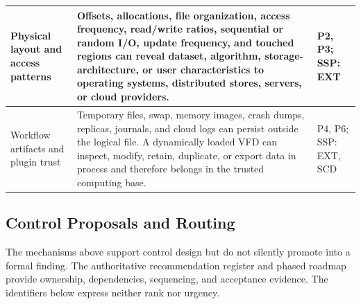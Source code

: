 \documentclass[../main.tex]{subfiles}
\begin{document}
\begin{longtable}{@{}p{}p{}p{}@{}}
Physical layout and access patterns &
Offsets, allocations, file organization, access frequency, read/write ratios,
sequential or random I/O, update frequency, and touched regions can reveal
dataset, algorithm, storage-architecture, or user characteristics to operating
systems, distributed stores, servers, or cloud providers. &
P2, P3; SSP: EXT \\
\hline

Workflow artifacts and plugin trust &
Temporary files, swap, memory images, crash dumps, replicas, journals, and
cloud logs can persist outside the logical file. A dynamically loaded VFD can
inspect, modify, retain, duplicate, or export data in process and therefore
belongs in the trusted computing base. &
P4, P6; SSP: EXT, SCD \\
\hline
\end{longtable}
\endgroup

\subsection{Control Proposals and Routing}

The mechanisms above support control design but do not silently promote
 into a formal finding. The authoritative recommendation
register and phased roadmap provide ownership, dependencies, sequencing, and
acceptance evidence. The identifiers below express neither rank nor urgency.
\end{document}
